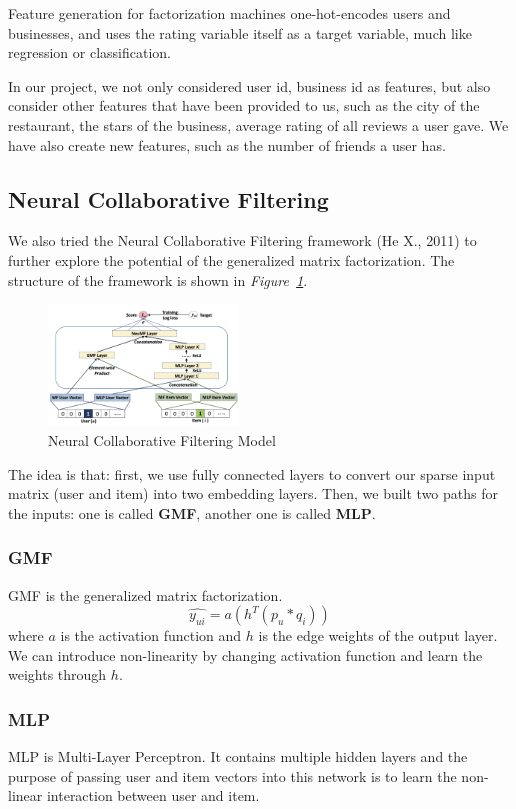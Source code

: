 \documentclass[journal]{IEEEtran}
\begin{document}
Feature generation for factorization machines one-hot-encodes users and businesses, and uses the rating variable itself as a target variable, much like regression or classification.

In our project, we not only considered user id, business id as features, but also consider other features that have been provided to us, such as the city of the restaurant, the stars of the business, average rating of all reviews a user gave. We have also create new features, such as the number of friends a user has.

\subsection{Neural Collaborative Filtering}
We also tried the Neural Collaborative Filtering framework (He X., 2011) to further explore the potential of the generalized matrix factorization. The structure of the framework is shown in {\it Figure~\ref{fig:ncf}}.  
\begin{figure}
 \center
  \includegraphics[width=0.45\textwidth]{images/NeuralCF_structure.png}
  \caption{Neural Collaborative Filtering Model}
  \label{fig:ncf}
\end{figure}

The idea is that: first, we use fully connected layers to convert our sparse input matrix (user and item) into two embedding layers. Then, we built two paths for the inputs: one is called \textbf{GMF}, another one is called \textbf{MLP}.
\subsubsection{GMF}
GMF is the generalized matrix factorization. 
\begin{equation}
    \hat{y_{ui}} = a(h^T(p_u*q_i))
    \label{equation:GMF}
\end{equation}
where $a$ is the activation function and $h$ is the edge weights of the output layer. We can introduce non-linearity by changing activation function and learn the weights through $h$.

\subsubsection{MLP}
MLP is Multi-Layer Perceptron. It contains multiple hidden layers and the purpose of passing user and item vectors into this network is to learn the non-linear interaction between user and item. 
\end{document}
